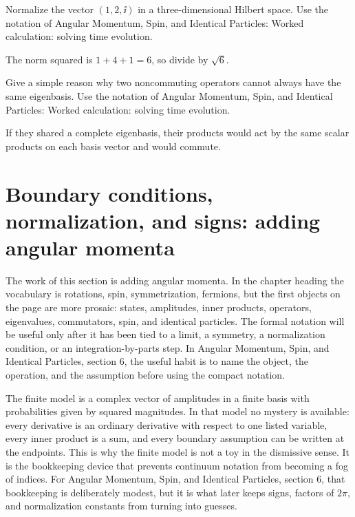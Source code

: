 \begin{exercise}
Normalize the vector \((1,2,\ii)\) in a three-dimensional Hilbert space.  Use the notation of Angular Momentum, Spin, and Identical Particles: Worked calculation: solving time evolution.
\begin{answer}
The norm squared is \(1+4+1=6\), so divide by \(\sqrt6\).
\end{answer}
\end{exercise}

\begin{exercise}
Give a simple reason why two noncommuting operators cannot always have the same eigenbasis.  Use the notation of Angular Momentum, Spin, and Identical Particles: Worked calculation: solving time evolution.
\begin{answer}
If they shared a complete eigenbasis, their products would act by the same scalar products on each basis vector and would commute.
\end{answer}
\end{exercise}



\section{Boundary conditions, normalization, and signs: adding angular momenta}

The work of this section is adding angular momenta.  In the chapter heading the vocabulary is rotations, spin, symmetrization, fermions, but the first objects on the page are more prosaic: states, amplitudes, inner products, operators, eigenvalues, commutators, spin, and identical particles.  The formal notation will be useful only after it has been tied to a limit, a symmetry, a normalization condition, or an integration-by-parts step.  In Angular Momentum, Spin, and Identical Particles, section 6, the useful habit is to name the object, the operation, and the assumption before using the compact notation.

The finite model is a complex vector of amplitudes in a finite basis with probabilities given by squared magnitudes.  In that model no mystery is available: every derivative is an ordinary derivative with respect to one listed variable, every inner product is a sum, and every boundary assumption can be written at the endpoints.  This is why the finite model is not a toy in the dismissive sense.  It is the bookkeeping device that prevents continuum notation from becoming a fog of indices.  For Angular Momentum, Spin, and Identical Particles, section 6, that bookkeeping is deliberately modest, but it is what later keeps signs, factors of \(2\pi\), and normalization constants from turning into guesses.

